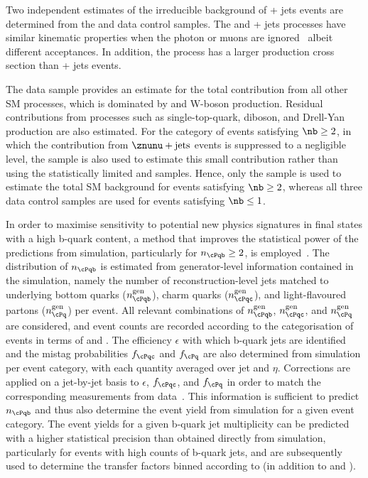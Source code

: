 Two independent estimates of the irreducible background of \znunu +
jets events are determined from the \gj and \mmj data control samples.
The \gj and \zmumu + jets processes have similar kinematic properties
when the photon or muons are ignored~\cite{Bern:2011pa} albeit
different acceptances. In addition, the \gj process has a larger
production cross section than \znunu + jets events.

The \mj data sample provides an estimate for the total
contribution from all other SM processes, which is dominated by \ttbar
and W-boson production. Residual contributions from processes such as
single-top-quark, diboson, and Drell-Yan production are also
estimated. For the category of events satisfying $\nb \geq 2$, in
which the contribution from $\znunu + \text{jets}$ events is
suppressed to a negligible level, the \mj sample is also used to
estimate this small contribution rather than using the statistically
limited \mmj and \gj samples. Hence, only the \mj sample is used to
estimate the total SM background for events satisfying $\nb \geq 2$,
whereas all three data control samples are used for events satisfying
$\nb \leq 1$.

In order to maximise sensitivity to potential new physics signatures
in final states with a high b-quark content, a method that improves
the statistical power of the predictions from simulation, particularly
for $n_\cPqb \ge 2$, is employed~\cite{RA1Paper2012}. The distribution
of $n_\cPqb$ is estimated from generator-level information contained
in the simulation, namely the number of reconstruction-level jets
matched to underlying bottom quarks ($n_\cPqb^\text{gen}$), charm
quarks ($n_\cPqc^\text{gen}$), and light-flavoured partons
($n_\cPq^\text{gen}$) per event. All relevant combinations of
$n_\cPqb^{\rm gen}$, $n_\cPqc^{\rm gen}$, and $n_{\cPq}^{\rm gen}$ are
considered, and event counts are recorded according to the
categorisation of events in terms of \njet and \scalht. The efficiency
$\epsilon$ with which b-quark jets are identified and the mistag
probabilities $f_\cPqc$ and $f_\cPq$ are also determined from
simulation per event category, with each quantity averaged over jet
\pt and $\eta$. Corrections are applied on a jet-by-jet basis to
$\epsilon$, $f_\cPqc$, and $f_\cPq$ in order to match the
corresponding measurements from data~\cite{CMS-PAS-BTV-12-001}. This
information is sufficient to predict $n_\cPqb$ and thus also determine
the event yield from simulation for a given event category. The event
yields for a given b-quark jet multiplicity can be predicted with a
higher statistical precision than obtained directly from simulation,
particularly for events with high counts of b-quark jets, and are
subsequently used to determine the transfer factors binned according
to \nb (in addition to \njet and \scalht).

